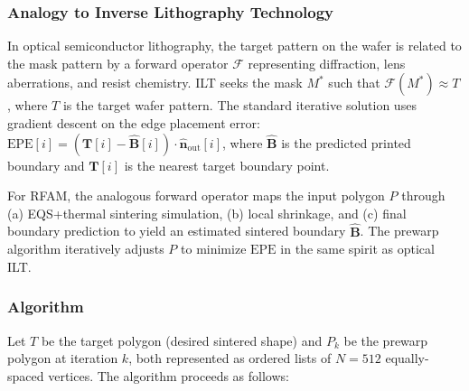 \documentclass[5p,times]{elsarticle}
\newcommand{\EPE}{\mathrm{EPE}}
\newcommand{\vect}[1]{\boldsymbol{#1}}
\newcommand{\nhat}{\hat{\vect{n}}}
\begin{document}
\subsubsection{Analogy to Inverse Lithography Technology}

In optical semiconductor lithography, the target pattern on the wafer
is related to the mask pattern by a forward operator $\mathcal{F}$
representing diffraction, lens aberrations, and resist chemistry.  ILT
seeks the mask $M^*$ such that $\mathcal{F}(M^*) \approx T$, where
$T$ is the target wafer pattern.  The standard iterative solution
uses gradient descent on the edge placement error:
$\EPE[i] = (\vect{T}[i] - \hat{\vect{B}}[i]) \cdot \nhat_{\mathrm{out}}[i]$,
where $\hat{\vect{B}}$ is the predicted printed boundary and
$\vect{T}[i]$ is the nearest target boundary point.

For RFAM, the analogous forward operator maps the input polygon $P$
through (a) EQS+thermal sintering simulation, (b) local shrinkage, and
(c) final boundary prediction to yield an estimated sintered boundary
$\hat{\vect{B}}$.  The prewarp algorithm iteratively adjusts $P$ to
minimize $\EPE$ in the same spirit as optical ILT.

\subsubsection{Algorithm}

Let $T$ be the target polygon (desired sintered shape) and $P_k$ be
the prewarp polygon at iteration $k$, both represented as ordered
lists of $N = 512$ equally-spaced vertices.  The algorithm proceeds
as follows:
\end{document}
